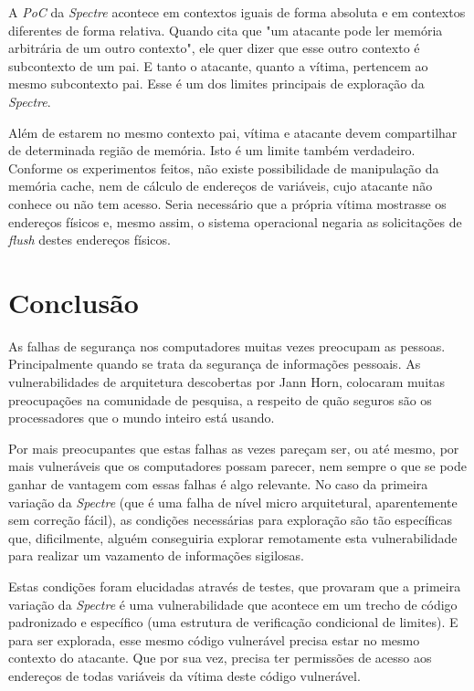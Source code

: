 \documentclass[conference]{IEEEtran}
\begin{document}
A \emph{PoC} da \emph{Spectre} acontece em contextos iguais de forma absoluta e em contextos diferentes de forma relativa. Quando  cita que "um atacante pode ler memória arbitrária de um outro contexto", ele quer dizer que esse outro contexto é subcontexto de um pai. E tanto o atacante, quanto a vítima, pertencem ao mesmo subcontexto pai. Esse é um dos limites principais de exploração da \emph{Spectre}.

Além de estarem no mesmo contexto pai, vítima e atacante devem compartilhar de determinada região de memória. Isto é um limite também verdadeiro. Conforme os experimentos feitos, não existe possibilidade de manipulação da memória cache, nem de cálculo de endereços de variáveis, cujo atacante não conhece ou não tem acesso. Seria necessário que a própria vítima mostrasse os endereços físicos e, mesmo assim, o sistema operacional negaria as solicitações de \emph{flush} destes endereços físicos.

\section{Conclusão}
As falhas de segurança nos computadores muitas vezes preocupam as pessoas. Principalmente quando se trata da segurança de informações pessoais. As vulnerabilidades de arquitetura descobertas por Jann Horn, colocaram muitas preocupações na comunidade de pesquisa, a respeito de quão seguros são os processadores que o mundo inteiro está usando.

Por mais preocupantes que estas falhas as vezes pareçam ser, ou até mesmo, por mais vulneráveis que os computadores possam parecer, nem sempre o que se pode ganhar de vantagem com essas falhas é algo relevante. No caso da primeira variação da \emph{Spectre} (que é uma falha de nível micro arquitetural, aparentemente sem correção fácil), as condições necessárias para exploração são tão específicas que, dificilmente, alguém conseguiria explorar remotamente esta vulnerabilidade para realizar um vazamento de informações sigilosas.

Estas condições foram elucidadas através de testes, que provaram que a primeira variação da \emph{Spectre} é uma vulnerabilidade que acontece em um trecho de código padronizado e específico (uma estrutura de verificação condicional de limites). E para ser explorada, esse mesmo código vulnerável precisa estar no mesmo contexto do atacante. Que por sua vez, precisa ter permissões de acesso aos endereços de todas variáveis da vítima deste código vulnerável.
\end{document}
